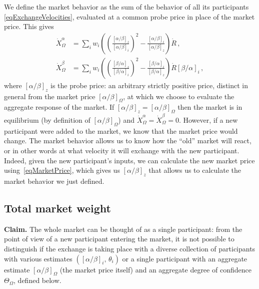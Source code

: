 \documentclass[letterpaper]{article}
\newcommand{\priceAB}{\left[\alpha / \beta\right]}
\newcommand{\priceBA}{\left[\beta / \alpha\right]}
\begin{document}
We define the market behavior as the sum of the behavior of all its participants \eqref{eqExchangeVelocities}, evaluated at a common probe price in place of the market price. This gives
\begin{align}
    \dot{X}_\Omega^\alpha &= \sum_i w_i \left( \left( \frac{\priceAB_z}{\priceAB_i}\right)^2 - \frac{\priceAB_i}{\priceAB_z} \right) \dot{R} \,, \nonumber\\
    \dot{X}_\Omega^\beta  &= \sum_i w_i \left( \left( \frac{\priceBA_z}{\priceBA_i}\right)^2 - \frac{\priceBA_i}{\priceBA_z} \right) \dot{R} \priceBA_i \,, \label{eqDefMarketBehavior}
\end{align}
where $\priceAB_z$ is the probe price: an arbitrary strictly positive price, distinct in general from the market price $\priceAB_\Omega$, at which we choose to evaluate the aggregate response of the market. If $\priceAB_z = \priceAB_\Omega$ then the market is in equilibrium (by definition of $\priceAB_\Omega$) and $\dot{X}_\Omega^\alpha=\dot{X}_\Omega^\beta=0$. However, if a new participant were added to the market, we know that the market price would change. The market behavior allows us to know how the ``old'' market will react, or in other words at what velocity it will exchange with the new participant. Indeed, given the new participant's inputs, we can calculate the new market price using~\eqref{eqMarketPrice}, which gives us $\priceAB_z$ that allows us to calculate the market behavior we just defined.

\subsection{Total market weight}

\textbf{Claim.} The whole market can be thought of as a single participant: from the point of view of a new participant entering the market, it is not possible to distinguish if the exchange is taking place with a diverse collection of participants with various estimates $(\priceAB_i,\, \theta_i)$ or a single participant with an aggregate estimate $\priceAB_\Omega$ (the market price itself) and an aggregate degree of confidence $\Theta_\Omega$, defined below.
\end{document}
